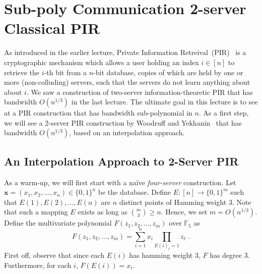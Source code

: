 \newcommand{\bits}{\{0,1\}}
\newcommand{\bfu}{\mathbf{u}}
\newcommand{\bfv}{\mathbf{v}}
\newcommand{\bfp}{\mathbf{p}}
\newcommand{\bfz}{\mathbf{z}}
\newcommand{\bfx}{\mathbf{x}}
\newcommand{\bfy}{\mathbf{y}}

\newcommand{\bbZ}{\mathbb{Z}}
\newcommand{\calR}{\mathcal{R}}

\section{Sub-poly Communication 2-server Classical PIR}

As introduced in the earlier lecture, Private Information Retreival~(PIR)~\cite{chor1998private} is a cryptographic mechanism which allows a user holding an index $i\in[n]$ to retrieve the $i$-th bit from a $n$-bit database, copies of which are held by one or more (non-colluding) servers, such that the servers do not learn anything about about $i$. We saw a construction of two-server information-theoretic PIR that has bandwidth $O(n^{1/3})$ in the last lecture. The ultimate goal in this lecture is to see at a PIR construction that has bandwidth sub-polynomial in $n$.
As a first step, we will see a 2-server PIR construction by Woodruff and Yekhanin~\cite{woodruff2005geometric} that has bandwidth $O(n^{1/3})$, based on an interpolation approach.
\subsection{An Interpolation Approach to 2-Server PIR}
As a warm-up, we will first start with a na\"ive \emph{four-server} construction. Let $\bfx=(x_1,x_2,\ldots,x_n)\in \bits^n$ be the database. Define $E:[n]\to \bits^m$ such that $E(1),E(2),\ldots,E(n)$ are $n$ distinct points of Hamming weight $3$. Note that such a mapping $E$ exists as long as ${m\choose 3}\ge n$. Hence, we set $m=O(n^{1/3})$. Define the multivariate polynomial $F(z_1,z_2,\ldots,z_m)$ over $\mathbb{F}_5$ as
\[
F(z_1,z_2,\ldots,z_m)=\sum_{i=1}^nx_i\prod_{E(i)_\ell=1}z_\ell\;.
\]
First off, observe that since each $E(i)$ has hamming weight $3$, $F$ has degree $3$. Furthermore, for each $i$, $F(E(i))=x_i$.

